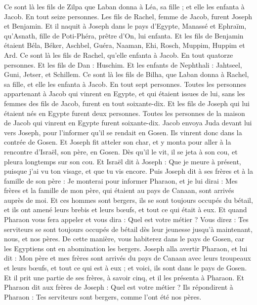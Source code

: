 \begin{multicols}{2}
Ce sont là les fils de Zilpa que Laban donna à Léa, sa fille ; et elle les enfanta à Jacob. En tout seize personnes.
Les fils de Rachel, femme de Jacob, furent Joseph et Benjamin.
Et il naquit à Joseph dans le  pays d'Egypte, Manassé et Ephraïm, qu'Asnath, fille de Poti-Phéra, prêtre d'On, lui enfanta.
Et les fils de Benjamin étaient Béla, Béker, Aschbel, Guéra, Naaman, Ehi, Rosch, Muppim, Huppim et Ard.
Ce sont là les fils de Rachel, qu'elle enfanta à Jacob. En tout quatorze personnes.
Et les fils de Dan : Huschim.
Et les enfants de Nephthali : Jahtseel, Guni, Jetser, et Schillem.
Ce sont là les fils de Bilha, que Laban donna à Rachel, sa fille, et elle les enfanta à Jacob. En tout sept personnes.
Toutes les personnes appartenant à Jacob qui vinrent en Egypte, et qui étaient issues de lui, sans les femmes des fils de Jacob, furent en tout soixante-dix.
Et les fils de Joseph qui lui étaient nés en Egypte furent deux personnes. Toutes les personnes de la maison de Jacob qui vinrent en Egypte furent soixante-dix.
Jacob envoya Juda devant lui vers Joseph, pour l’informer qu’il se rendait en Gosen. Ils vinrent donc dans la contrée de Gosen.
Et Joseph fit atteler son char, et y monta pour aller à la rencontre d'Israël, son père, en Gosen. Dès qu’il le vit, il se jeta à son cou, et pleura longtemps sur son cou.
Et Israël dit à Joseph : Que je meure à présent, puisque j'ai vu ton visage, et que tu vis encore.
Puis Joseph dit à ses frères et à la famille de son père : Je monterai pour informer Pharaon, et je lui dirai : Mes frères et la famille de mon père, qui étaient au pays de Canaan, sont arrivés auprès de moi.
Et ces hommes sont bergers, ils se sont toujours occupés du bétail, et ils ont amené leurs brebis et leurs bœufs, et tout ce qui était à eux.
Et quand Pharaon vous fera appeler et vous dira : Quel est votre métier ?
Vous direz : Tes serviteurs se sont toujours occupés de bétail dès leur jeunesse jusqu'à maintenant, nous, et nos pères. De cette manière, vous habiterez dans le pays de Gosen, car les Egyptiens ont en abomination les bergers.
\VerseOne{}Joseph alla avertir Pharaon, et lui dit : Mon père  et mes frères sont arrivés du pays de Canaan avec leurs troupeaux et leurs bœufs, et tout ce qui est à eux ; et voici, ils sont dans le pays de Gosen.
Et il prit une partie de ses frères, à savoir cinq, et il les présenta à Pharaon.
Et Pharaon dit aux frères de Joseph : Quel est votre métier ? Ils répondirent à Pharaon : Tes serviteurs sont bergers, comme l'ont été nos pères.

\end{multicols}
